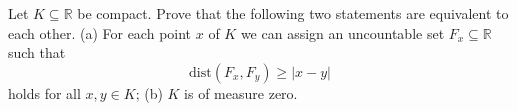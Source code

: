Let $K\subseteq \mathbb{R}$ be compact. Prove that the following two statements are equivalent to each other.
(a) For each point $x$ of $K$ we can assign an uncountable set $F_x\subseteq \mathbb{R}$ such that
$$\mathrm{dist}(F_x, F_y)\ge |x-y|$$holds for all $x,y\in K$;
(b) $K$ is of measure zero.